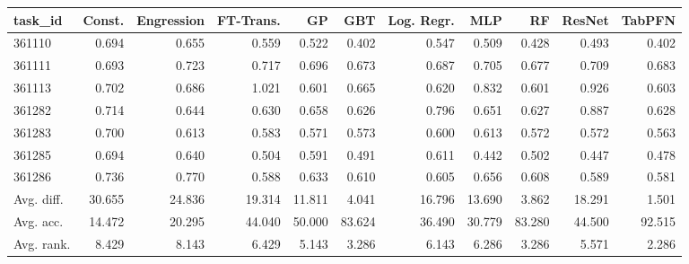 \begin{tabular}{lrrrrrrrrrr}
\toprule
task\_id & Const. & Engression & FT-Trans. & GP & GBT & Log. Regr. & MLP & RF & ResNet & TabPFN \\
\midrule
361110 & 0.694 & 0.655 & 0.559 & 0.522 & 0.402 & 0.547 & 0.509 & 0.428 & 0.493 & 0.402 \\
361111 & 0.693 & 0.723 & 0.717 & 0.696 & 0.673 & 0.687 & 0.705 & 0.677 & 0.709 & 0.683 \\
361113 & 0.702 & 0.686 & 1.021 & 0.601 & 0.665 & 0.620 & 0.832 & 0.601 & 0.926 & 0.603 \\
361282 & 0.714 & 0.644 & 0.630 & 0.658 & 0.626 & 0.796 & 0.651 & 0.627 & 0.887 & 0.628 \\
361283 & 0.700 & 0.613 & 0.583 & 0.571 & 0.573 & 0.600 & 0.613 & 0.572 & 0.572 & 0.563 \\
361285 & 0.694 & 0.640 & 0.504 & 0.591 & 0.491 & 0.611 & 0.442 & 0.502 & 0.447 & 0.478 \\
361286 & 0.736 & 0.770 & 0.588 & 0.633 & 0.610 & 0.605 & 0.656 & 0.608 & 0.589 & 0.581 \\
Avg. diff. & 30.655 & 24.836 & 19.314 & 11.811 & 4.041 & 16.796 & 13.690 & 3.862 & 18.291 & 1.501 \\
Avg. acc. & 14.472 & 20.295 & 44.040 & 50.000 & 83.624 & 36.490 & 30.779 & 83.280 & 44.500 & 92.515 \\
Avg. rank. & 8.429 & 8.143 & 6.429 & 5.143 & 3.286 & 6.143 & 6.286 & 3.286 & 5.571 & 2.286 \\
\bottomrule
\end{tabular}
